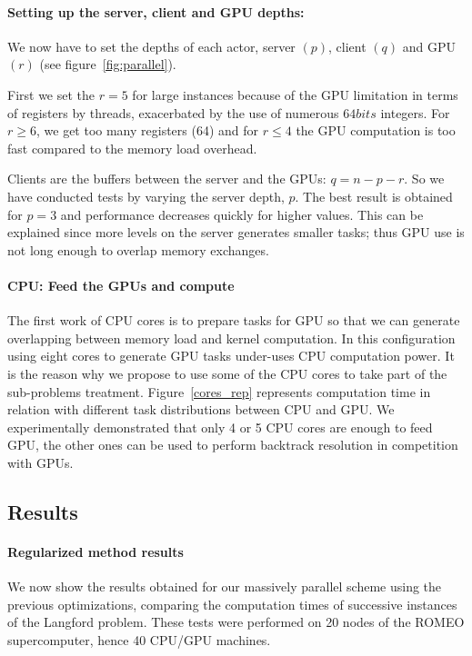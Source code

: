 \paragraph{Setting up the server, client and GPU depths: }
We now have to set the depths of each actor, server $(p)$, client $(q)$ and GPU $(r)$ (see figure~\ref{fig:parallel}).

First we set the $r = 5$ for large instances because of the GPU limitation in terms of registers by threads, exacerbated by the use of numerous $64bits$ integers. For $r \geq 6$, we get too many registers (64) and for $r \leq 4$ the GPU computation is too fast compared to the memory load overhead.

Clients are the buffers between the server and the GPUs: 
$q = n - p- r$.
So we have conducted tests by varying the server depth, $p$. The best result is obtained for $p=3$ and performance decreases quickly for higher values. This can be explained since more levels on the server generates smaller tasks; thus GPU use is not long enough to overlap memory exchanges.

\paragraph{CPU: Feed the GPUs and compute}
The first work of CPU cores is to prepare tasks for GPU so that we can generate overlapping between memory load and kernel computation. 
In this configuration using eight cores to generate GPU tasks under-uses CPU computation power. 
It is the reason why we propose to use some of the CPU cores to take part of the sub-problems treatment. 
Figure~\ref{cores_rep} represents computation time in relation with different task distributions between CPU and GPU.
We experimentally demonstrated that only 4 or 5 CPU cores are enough to feed GPU, the other ones can be used to perform backtrack resolution in competition with GPUs.

\subsection{Results}

\paragraph{Regularized method results}
We now show the results obtained for our massively parallel scheme using the previous optimizations, comparing the computation times of successive instances of the Langford problem. These tests were performed on 20 nodes of the ROMEO supercomputer, hence 40 CPU/GPU machines.

